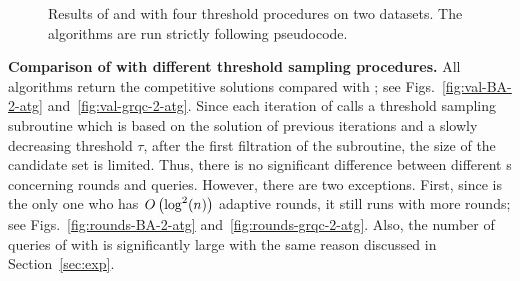 \begin{figure}[t]
{  }
  \caption{Results of \atg and \latg with four threshold procedures on two datasets. 
  The algorithms are run strictly following pseudocode.
   } \label{fig:main3}
\end{figure}
\textbf{Comparison of \latg with different threshold sampling procedures.}
All \latg algorithms return the competitive solutions compared with \iter;
see Figs.~\ref{fig:val-BA-2-atg} and~\ref{fig:val-grqc-2-atg}.
Since each iteration of \latg calls a threshold sampling subroutine
which is based on the solution of previous iterations and 
a slowly decreasing threshold $\tau$,
after the first filtration of the subroutine, the size of the candidate set is limited.
Thus, there is no significant difference between different {\latg}s
concerning rounds and queries.
However, there are two exceptions.
First, since \tsbin is the only one who has $O\left( \log^2(n) \right)$ adaptive rounds,
it still runs with more rounds; see Figs.~\ref{fig:rounds-BA-2-atg} and~\ref{fig:rounds-grqc-2-atg}.
Also, the number of queries of \latg with \thresam is significantly large
with the same reason discussed in Section~\ref{sec:exp}.

